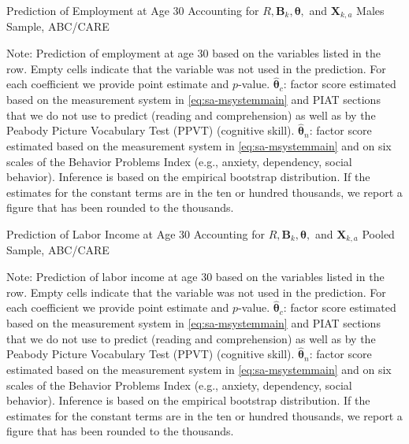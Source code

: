 \begin{table}
\begin{threeparttable}
\caption{Prediction of Employment at Age 30 Accounting for $R, \bm{B}_k, \bm{\theta},$ and $\bm{X}_{k,a}$ Males Sample, ABC/CARE}
\label{table:end2}
\centering
\scriptsize

\begin{tablenotes}
\footnotesize
\item Note: Prediction of employment at age 30 based on the variables listed in the row. Empty cells indicate that the variable was not used in the prediction. For each coefficient we provide point estimate and $p$-value. $\hat{\bm{\theta}}_{c}$: factor score estimated based on the measurement system in \eqref{eq:sa-msystemmain} and PIAT sections that we do not use to predict (reading and comprehension) as well as by the Peabody Picture Vocabulary Test (PPVT) (cognitive skill). $\hat{\bm{\theta}}_{n}$: factor score estimated based on the measurement system in \eqref{eq:sa-msystemmain} and on six scales of the Behavior Problems Index (e.g., anxiety, dependency, social behavior). Inference is based on the empirical bootstrap distribution. If the estimates for the constant terms are in the ten or hundred thousands, we report a figure that has been rounded to the thousands.
\end{tablenotes}
\end{threeparttable}
\end{table}

\begin{table}
\begin{threeparttable}
\caption{Prediction of Labor Income at Age 30 Accounting for $R, \bm{B}_k, \bm{\theta},$ and $\bm{X}_{k,a}$ Pooled Sample, ABC/CARE}
\label{table:end2}
\centering
\scriptsize

\begin{tablenotes}
\footnotesize
\item Note: Prediction of labor income at age 30 based on the variables listed in the row. Empty cells indicate that the variable was not used in the prediction. For each coefficient we provide point estimate and $p$-value. $\hat{\bm{\theta}}_{c}$: factor score estimated based on the measurement system in \eqref{eq:sa-msystemmain} and PIAT sections that we do not use to predict (reading and comprehension) as well as by the Peabody Picture Vocabulary Test (PPVT) (cognitive skill). $\hat{\bm{\theta}}_{n}$: factor score estimated based on the measurement system in \eqref{eq:sa-msystemmain} and on six scales of the Behavior Problems Index (e.g., anxiety, dependency, social behavior). Inference is based on the empirical bootstrap distribution. If the estimates for the constant terms are in the ten or hundred thousands, we report a figure that has been rounded to the thousands.
\end{tablenotes}
\end{threeparttable}
\end{table}

